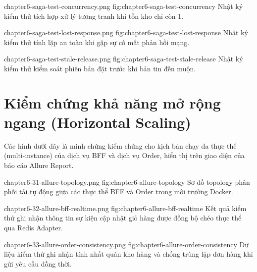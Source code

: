   {chapter6-saga-test-concurrency.png}
  {fig:chapter6-saga-test-concurrency}
  {Nhật ký kiểm thử tích hợp xử lý tương tranh khi tồn kho chỉ còn 1.}

  {chapter6-saga-test-lost-response.png}
  {fig:chapter6-saga-test-lost-response}
  {Nhật ký kiểm thử tính lặp an toàn khi gặp sự cố mất phản hồi mạng.}

  {chapter6-saga-test-stale-release.png}
  {fig:chapter6-saga-test-stale-release}
  {Nhật ký kiểm thử kiểm soát phiên bản đặt trước khi bản tin đến muộn.}

\section{Kiểm chứng khả năng mở rộng ngang (Horizontal Scaling)}

Các hình dưới đây là minh chứng kiểm chứng cho kịch bản chạy đa thực thể (multi-instance) của dịch vụ BFF và dịch vụ Order, hiển thị trên giao diện của báo cáo Allure Report.

  {chapter6-31-allure-topology.png}
  {fig:chapter6-allure-topology}
  {Sơ đồ topology phân phối tải tự động giữa các thực thể BFF và Order trong môi trường Docker.}

  {chapter6-32-allure-bff-realtime.png}
  {fig:chapter6-allure-bff-realtime}
  {Kết quả kiểm thử ghi nhận thông tin sự kiện cập nhật giỏ hàng được đồng bộ chéo thực thể qua Redis Adapter.}

  {chapter6-33-allure-order-consistency.png}
  {fig:chapter6-allure-order-consistency}
  {Dữ liệu kiểm thử ghi nhận tính nhất quán kho hàng và chống trùng lặp đơn hàng khi gửi yêu cầu đồng thời.}

\FloatBarrier
\clearpage

